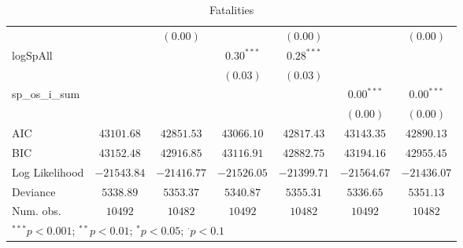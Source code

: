 \begin{sidewaystable}
\begin{center}
{\begin{tabular}{l c c c c c c}
                &               & $(0.00)$      &               & $(0.00)$      &               & $(0.00)$      \\
logSpAll        &               &               & $0.30^{***}$  & $0.28^{***}$  &               &               \\
                &               &               & $(0.03)$      & $(0.03)$      &               &               \\
sp\_os\_i\_sum  &               &               &               &               & $0.00^{***}$  & $0.00^{***}$  \\
                &               &               &               &               & $(0.00)$      & $(0.00)$      \\
\hline
AIC             & $43101.68$    & $42851.53$    & $43066.10$    & $42817.43$    & $43143.35$    & $42890.13$    \\
BIC             & $43152.48$    & $42916.85$    & $43116.91$    & $42882.75$    & $43194.16$    & $42955.45$    \\
Log Likelihood  & $-21543.84$   & $-21416.77$   & $-21526.05$   & $-21399.71$   & $-21564.67$   & $-21436.07$   \\
Deviance        & $5338.89$     & $5353.37$     & $5340.87$     & $5355.31$     & $5336.65$     & $5351.13$     \\
Num. obs.       & $10492$       & $10482$       & $10492$       & $10482$       & $10492$       & $10482$       \\
\hline
\multicolumn{7}{l}{\scriptsize{$^{***}p<0.001$; $^{**}p<0.01$; $^{*}p<0.05$; $^{\cdot}p<0.1$}}
\end{tabular}
}
\caption{Fatalities}
\label{deaths}
\end{center}
\end{sidewaystable}
